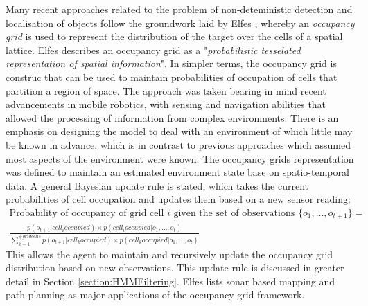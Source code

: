Many recent approaches related to the problem of non-deteministic detection and localisation of objects follow the groundwork laid by Elfes \cite{Elfes1989UsingNavigation}, whereby an \textit{occupancy grid} is used to represent the distribution of the target over the cells of a spatial lattice. Elfes describes an occupancy grid as a "\textit{probabilistic tesselated representation of spatial information}". In simpler terms, the occupancy grid is construc that can be used to maintain probabilities of occupation of cells that partition a region of space. %
The approach was taken bearing in mind recent advancements in mobile robotics, with sensing and navigation abilities that allowed the processing of information from complex environments. There is an emphasis on designing the model to deal with an environment of which little may be known in advance, which is in contrast to previous approaches which assumed most aspects of the environment were known. The occupancy grids representation was defined to maintain an estimated environment state base on spatio-temporal data. A general Bayesian update rule is stated, which takes the current probabilities of cell occupation and updates them based on a new sensor reading: 
\begin{gather*}%
  \text{Probability of occupancy of grid cell } i \text{ given the set of observations } \{o_1, ..., o_{t+1}\} = \\
\frac{p(o_{t+1} | cell_i occupied) \times p(cell_i occupied | o_1, ..., o_t)}{\sum_{k=1}^{\# grid cells} p(o_{t+1} | cell_k occupied) \times p(cell_k occupied | o_1, ..., o_t)}
\end{gather*}
This allows the agent to maintain and recursively update the occupancy grid distribution based on new observations. This update rule is discussed in greater detail in Section \ref{section:HMMFiltering}. Elfes lists sonar based mapping and path planning as major applications of the occupancy grid framework.


